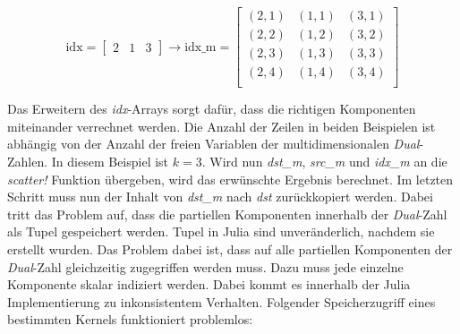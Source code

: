 \begin{equation}
\text{idx}= 
\begin{bmatrix}
 2 & 1 & 3
\end{bmatrix}
\rightarrow
\text{idx\_m} = 
\begin{bmatrix}
 (2, 1) & (1, 1) & (3, 1) \\ 
 (2, 2) & (1, 2) & (3, 2) \\
 (2, 3) & (1, 3) & (3, 3) \\
 (2, 4) & (1, 4) & (3, 4) \\
\end{bmatrix}
\end{equation}

Das Erweitern des \textit{idx}-Arrays sorgt dafür, dass die richtigen Komponenten miteinander verrechnet werden.
Die Anzahl der Zeilen in beiden Beispielen ist abhängig von der Anzahl der freien Variablen  
der multidimensionalen \textit{Dual}-Zahlen. In diesem Beispiel ist $k = 3$.
Wird nun \textit{dst\_m}, \textit{src\_m} und \textit{idx\_m} an die \textit{scatter!} Funktion übergeben, wird das erwünschte Ergebnis berechnet. 
Im letzten Schritt muss nun der Inhalt von \textit{dst\_m} nach \textit{dst} zurückkopiert werden.
Dabei tritt das Problem auf, dass die partiellen Komponenten innerhalb der \textit{Dual}-Zahl
als Tupel gespeichert werden.
Tupel in Julia sind unveränderlich, nachdem sie erstellt wurden.
Das Problem dabei ist, dass auf alle partiellen Komponenten der \textit{Dual}-Zahl gleichzeitig zugegriffen werden muss.
Dazu muss jede einzelne Komponente skalar indiziert werden.
Dabei kommt es innerhalb der Julia Implementierung zu inkonsistentem Verhalten.
Folgender Speicherzugriff eines bestimmten Kernels funktioniert problemlos:


